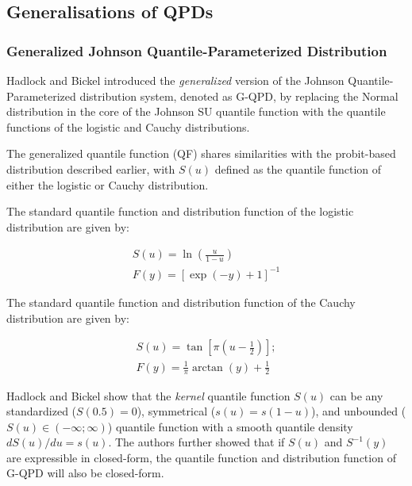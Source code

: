 \documentclass[
  fleqn,
  deca,
  blindrev
]{informs4}
\begin{document}
\subsection{Generalisations of QPDs}\label{generalisations-of-qpds}

\subsubsection{Generalized Johnson Quantile-Parameterized
Distribution}\label{generalized-johnson-quantile-parameterized-distribution}

Hadlock and Bickel
\citep{hadlock2019GeneralizedJohnsonQuantileParameterized} introduced
the \emph{generalized} version of the Johnson Quantile-Parameterized
distribution system, denoted as G-QPD, by replacing the Normal
distribution in the core of the Johnson SU quantile function with the
quantile functions of the logistic and Cauchy distributions.

The generalized quantile function (QF) shares similarities with the
probit-based distribution described earlier, with \(S(u)\) defined as
the quantile function of either the logistic or Cauchy distribution.

The standard quantile function and distribution function of the logistic
distribution are given by:

\[
\begin{gathered}
S(u)= \ln\left(\frac{u}{1-u}\right)\\ 
F(y)=[\exp(-y)+1]^{-1}
\end{gathered}
\]

The standard quantile function and distribution function of the Cauchy
distribution are given by:

\[
\begin{gathered}
S(u)= \tan\left[\pi\left(u-\frac{1}{2}\right)\right];\\ F(y)=\frac{1}{ \pi}\arctan(y)+\frac{1}{2}
\end{gathered}
\]

Hadlock and Bickel
\citep{hadlock2019GeneralizedJohnsonQuantileParameterized} show that the
\emph{kernel} quantile function \(S(u)\) can be any standardized
(\(S(0.5)=0\)), symmetrical (\(s(u)=s(1-u)\)), and unbounded
(\(S(u)\in(-\infty;\infty)\)) quantile function with a smooth quantile
density \(dS(u)/du=s(u)\). The authors further showed that if \(S(u)\)
and \(S^{-1}(y)\) are expressible in closed-form, the quantile function
and distribution function of G-QPD will also be closed-form.
\end{document}
